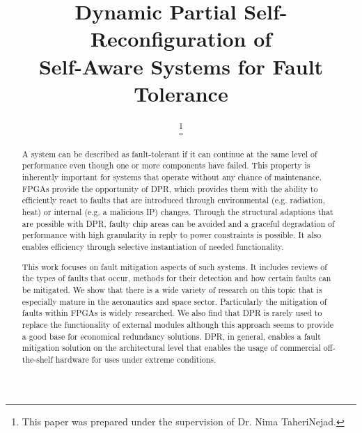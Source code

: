 \documentclass[10pt, journal]{IEEEtran}
\title{Dynamic Partial Self-Reconfiguration of \\Self-Aware Systems for Fault Tolerance}
\author{\IEEEauthorblockN{Constantin Schieber}
\IEEEauthorblockA{%
\\Institute of Computer Technology\\
TU Wien, Vienna, Austria\\
Constantin.Schieber@tuwien.ac.at}
\thanks{This paper was prepared under the supervision of Dr. Nima TaheriNejad.}
}
\begin{document}
\maketitle

\begin{abstract}
    A system can be described as fault-tolerant if it can continue at the same level of performance even though one or more components have failed. 
    This property is inherently important for systems that operate without any chance of maintenance.
    \glspl{FPGA} provide the opportunity of \gls{DPR}, which provides them with the ability to efficiently react to faults that are introduced through environmental (e.g. radiation, heat) or internal (e.g. a malicious \gls{IP}) changes.
    Through the structural adaptions that are possible with \gls{DPR}, faulty chip areas can be avoided and a graceful degradation of performance with high granularity in reply to power constraints is possible.
    It also enables efficiency through selective instantiation of needed functionality.
    
    This work focuses on fault mitigation aspects of such systems. 
    It includes reviews of the types of faults that occur, methods for their detection and how certain faults can be mitigated. 
    We show that there is a wide variety of research on this topic that is especially mature in the aeronautics and space sector.
    Particularly the mitigation of faults within \glspl{FPGA} is widely researched.
    We also find that \gls{DPR} is rarely used to replace the functionality of external modules although this approach seems to provide a good base for economical redundancy solutions.
    \gls{DPR}, in general, enables a fault mitigation solution on the architectural level that enables the usage of commercial off-the-shelf hardware for uses under extreme conditions.
    
    

\end{abstract}
\end{document}
